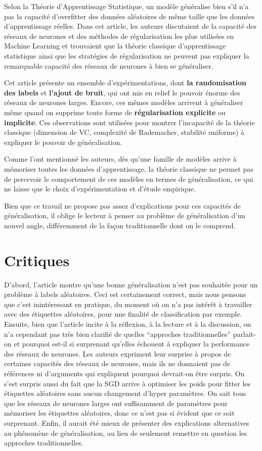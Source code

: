 \documentclass[a4paper,english,12pt, twocolumn]{article}
\begin{document}
Selon la Théorie d’Apprentissage Statistique, un modèle généralise bien s’il n’a pas la capacité d’overfitter des données aléatoires de même taille que les données d’apprentissage réelles. 
Dans cet article, les auteurs discutaient de la capacité des réseaux de neurones et des méthodes de régularisation les plus utilisées en Machine Learning et trouvaient que la théorie classique d’apprentissage statistique ainsi que les stratégies de régularisation ne peuvent pas expliquer la remarquable capacité des réseaux de neurones à bien se généraliser. 

Cet article présente un ensemble d’expérimentations, dont \textbf{la randomisation des labels} et \textbf{l’ajout de bruit}, qui ont mis en relief le pouvoir énorme des réseaux de neurones larges. Encore, ces mêmes modèles arrivent à généraliser même quand on supprime toute forme de \textbf{régularisation explicite} ou \textbf{implicite}. Ces observations sont utilisées pour montrer l’incapacité de la théorie classique (dimension de VC, complexité de Rademacher, stabilité uniforme) à expliquer le pouvoir de généralisation.  

Comme l’ont mentionné les auteurs, dès qu’une famille de modèles arrive à mémoriser toutes les données d’apprentissage, la théorie classique ne permet pas de percevoir le comportement de ces modèles en termes de généralisation, ce qui ne laisse que le choix d’expérimentation et d’étude empirique.

Bien que ce travail ne propose pas assez d’explications pour ces capacités de généralisation, il oblige le lecteur à penser au problème de généralisation d’un nouvel angle, différemment de la façon traditionnelle dont on le comprend. 
\vspace{-1em}
\section{Critiques}
\vspace{-1em}
D'abord, l’article montre qu’une bonne généralisation n’est pas souhaitée pour un problème à labels aléatoires. Ceci est certainement correct, mais nous pensons que c’est inintéressant en pratique, du moment où on n'a pas intérêt à travailler avec des étiquettes aléatoires, pour une finalité de classification par exemple.  
Ensuite, bien que l’article incite à la réflexion, à la lecture et à la discussion, on n’a cependant pas très bien clarifié de quelles “approches traditionnelles” parlait-on et pourquoi est-il si surprenant qu’elles échouent à expliquer la performance des réseaux de neurones. Les auteurs expriment leur surprise à propos de certaines capacités des réseaux de neurones, mais ils ne donnaient pas de références ni d’arguments qui expliquent pourquoi devrait-on être surpris. 
On s'est surpris aussi du fait que la SGD arrive à optimiser les poids pour fitter les étiquettes aléatoires sans aucun changement d'hyper paramètres. On sait tous que les réseaux de neurones larges ont suffisamment de paramètres pour mémoriser les étiquettes aléatoires, donc ce n’est pas si évident que ce soit surprenant. 
Enfin, il aurait été mieux de présenter des explications alternatives au phénomène de généralisation, au lieu de seulement remettre en question  les approches traditionnelles.
\vspace{-1em}
\end{document}
